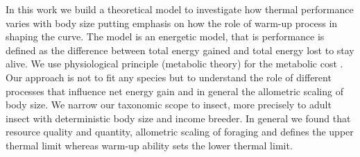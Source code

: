  In this work we build a theoretical model to investigate how thermal performance varies with body size putting emphasis on how the role of warm-up process in shaping the curve. 
The model is an energetic model, that is performance is defined as the difference between total energy gained and total energy lost to stay alive.
We use physiological principle (metabolic theory) for the metabolic cost \citep{Brown2004}.
Our approach is not to fit any species but to understand the role of different processes that influence net energy gain and in general the allometric scaling of body size.
We narrow our taxonomic scope to insect,  more precisely to adult insect with deterministic body size and income breeder. 
In general we found that resource quality and quantity, allometric scaling of foraging and defines the upper thermal limit whereas warm-up ability sets the lower thermal limit.
